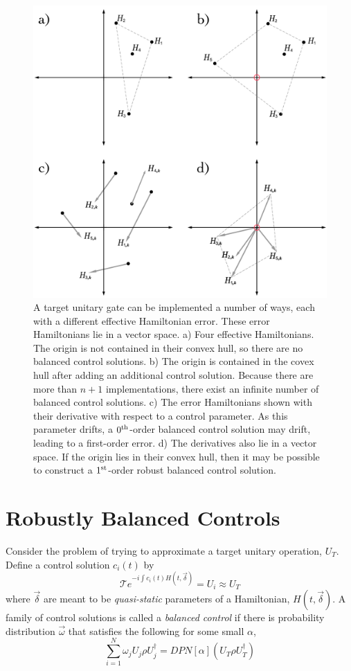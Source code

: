 \documentclass[aps,nofootinbib,pra,notitlepage,twocolumn]{revtex4-1}
\begin{document}
\begin{figure}
  \centering
  \includegraphics[width=\columnwidth]{vectorspace.pdf}
  \caption{A target unitary gate can be implemented a number of ways, each with a different effective Hamiltonian error. These error Hamiltonians lie in a vector space. a) Four effective Hamiltonians. The origin is not contained in their convex hull, so there are no balanced control solutions. b) The origin is contained in the covex hull after adding an additional control solution. Because there are more than $n+1$ implementations, there exist an infinite number of balanced control solutions. c) The error Hamiltonians shown with their derivative with respect to a control parameter. As this parameter drifts, a $0^{\rm th}$-order balanced control solution may drift, leading to a first-order error. d) The derivatives also lie in a vector space. If the origin lies in their convex hull, then it may be possible to construct a $1^{\rm{st}}$-order robust balanced control solution.}
  \label{fig:vectorspace}
\end{figure}

\section{Robustly Balanced Controls}
 Consider the problem of trying to approximate a target unitary operation, $U_T$. Define a control solution $c_i(t)$ by  \begin{equation}
\mathcal{T}e^{-i\int c_i(t)H(t, \vec{\delta})} = U_i \approx U_T
 \end{equation}
 where $\vec{\delta}$ are meant to be \textit{quasi-static}\cite{Ball2016} parameters of a Hamiltonian, $H(t, \vec{\delta})$. A family of control solutions is called a \emph{balanced control} if there is probability distribution $\vec{\omega}$ that satisfies the following for some small $\alpha$,
\begin{equation}\label{eq:1}
  \sum_{i=1}^N \omega_j U_j \rho U_j^\dagger = DPN[\alpha]\left(U_T \rho U_T^\dagger \right)
\end{equation}
\end{document}
